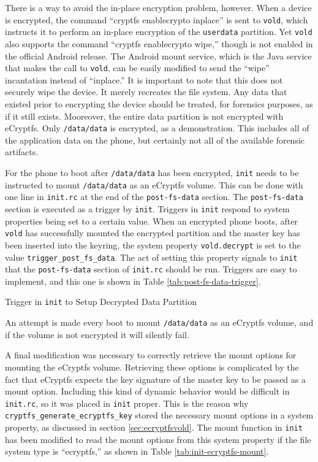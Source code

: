 There is a way to avoid the in-place encryption problem, however. When a device is encrypted, the command ``cryptfs enablecrypto
inplace'' is sent to \texttt{vold}, which instructs it to perform an in-place encryption of the \texttt{userdata} partition. Yet
\texttt{vold} also supports the command ``cryptfs enablecrypto wipe,'' though is not enabled in the official Android release. The
Android mount service, which is the Java service that makes the call to \texttt{vold}, can be easily modified to send the ``wipe''
incantation instead of ``inplace.'' It is important to note that this does not securely wipe the device. It merely recreates the
file system. Any data that existed prior to encrypting the device should be treated, for forensics purposes, as if it still exists.
Mooreover, the entire data partition is not encrypted with eCryptfs. Only \texttt{/data/data} is encrypted, as a demonstration. This
includes all of the application data on the phone, but certainly not all of the available forensic artifacts.

For the phone to boot after \texttt{/data/data} has been encrypted, \texttt{init} needs to be instructed to mount
\texttt{/data/data} as an eCryptfs volume. This can be done with one line in \texttt{init.rc} at the end of the
\texttt{post-fs-data} section. The \texttt{post-fs-data} section is executed as a trigger by \texttt{init}. Triggers in
\texttt{init} respond to system properties being set to a certain value. When an encrypted phone boots, after \texttt{vold} has
successfully mounted the encrypted partition and the master key has been inserted into the keyring, the system property
\texttt{vold.decrypt} is set to the value \texttt{trigger\_post\_fs\_data}. The act of setting this property signals to
\texttt{init} that the \texttt{post-fs-data} section of \texttt{init.rc} should be run. Triggers are easy to implement, and this one
is shown in Table \ref{tab:post-fs-data-trigger}.  
\begin{table}[!htb] 
 
\caption{Trigger in \texttt{init} to Setup Decrypted Data Partition}
\label{tab:post-fs-data-trigger} 
\end{table} 
An attempt is made every boot to mount
\texttt{/data/data} as an eCryptfs volume, and if the volume is not encrypted it will silently fail. 

A final modification was necessary to correctly retrieve the mount options for mounting the eCryptfs volume. Retrieving these
options is complicated by the fact that eCryptfs expects the key signature of the master key to be passed as a mount option.
Including this kind of dynamic behavior would be difficult in \texttt{init.rc}, so it was placed in \texttt{init} proper. This is
the reason why \texttt{cryptfs\_generate\_ecryptfs\_key} stored the necessary mount options in a system property, as discussed in
section \ref{sec:ecryptfsvold}. The mount function in \texttt{init} has been modified to read the mount options from this system
property if the file system type is ``ecryptfs,'' as shown in Table \ref{tab:init-ecryptfs-mount}.

